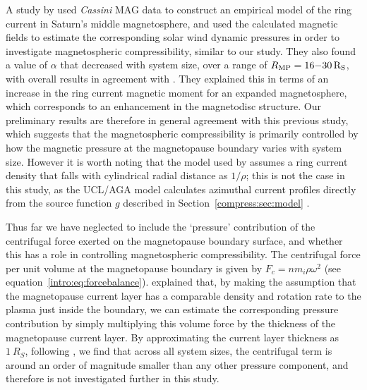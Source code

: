 A study by \citet{bunce2007} used \textit{Cassini} MAG data to construct an empirical model of the ring current in Saturn's middle magnetosphere, and used the calculated magnetic fields to estimate the corresponding solar wind dynamic pressures in order to investigate magnetospheric compressibility, similar to our study. They also found a value of $\alpha$ that decreased with system size, over a range of $R_\mathrm{MP} = 16{\--}\SI{30}{R_S}$, with overall results in agreement with \citet{arridge2006}. They explained this in terms of an increase in the ring current magnetic moment for an expanded magnetosphere, which corresponds to an enhancement in the magnetodisc structure. Our preliminary results are therefore in general agreement with this previous study, which suggests that the magnetospheric compressibility is primarily controlled by how the magnetic pressure at the magnetopause boundary varies with system size. However it is worth noting that the model used by \citet{bunce2007} assumes a ring current density that falls with cylindrical radial distance as $1/\rho$; this is not the case in this study, as the UCL/AGA model calculates azimuthal current profiles directly from the source function $g$ described in Section~\ref{compress:sec:model} \cite[see][]{caudal1986, achilleos2010a}.

Thus far we have neglected to include the `pressure' contribution of the centrifugal force exerted on the magnetopause boundary surface, and whether this has a role in controlling magnetospheric compressibility. The centrifugal force per unit volume at the magnetopause boundary is given by $F_c = nm_i\rho\omega^2$ (see equation~\ref{intro:eq:forcebalance}). \citet{pilkington2014} explained that, by making the assumption that the magnetopause current layer has a comparable density and rotation rate to the plasma just inside the boundary, we can estimate the corresponding pressure contribution by simply multiplying this volume force by the thickness of the magnetopause current layer. By approximating the current layer thickness as $\SI{1}{R_S}$, following \citet{masters2011}, we find that across all system sizes, the centrifugal term is around an order of magnitude smaller than any other pressure component, and therefore is not investigated further in this study.

